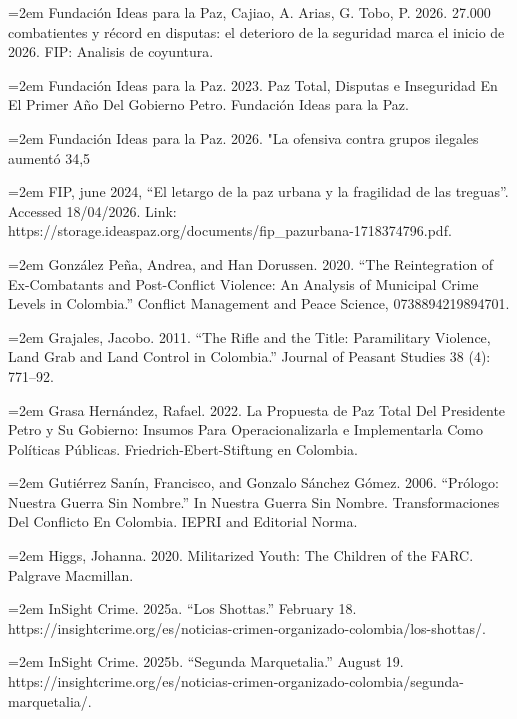 \documentclass[11pt]{article}
\begin{document}
\noindent
\hangindent=2em
Fundación Ideas para la Paz, Cajiao, A. Arias, G. Tobo, P. 2026. 27.000 combatientes y récord en disputas: el deterioro de la seguridad marca el inicio de 2026. FIP: Analisis de coyuntura.

\noindent
\hangindent=2em
Fundación Ideas para la Paz. 2023. Paz Total, Disputas e Inseguridad En El Primer Año Del Gobierno Petro. Fundación Ideas para la Paz.

\noindent
\hangindent=2em
Fundación Ideas para la Paz. 2026. "La ofensiva contra grupos ilegales aumentó 34,5%

\noindent
\hangindent=2em
FIP, june 2024, “El letargo de la paz urbana y la fragilidad de las treguas”. Accessed 18/04/2026. Link: https://storage.ideaspaz.org/documents/fip_pazurbana-1718374796.pdf.

\noindent
\hangindent=2em
González Peña, Andrea, and Han Dorussen. 2020. “The Reintegration of Ex-Combatants and Post-Conflict Violence: An Analysis of Municipal Crime Levels in Colombia.” Conflict Management and Peace Science, 0738894219894701.

\noindent
\hangindent=2em
Grajales, Jacobo. 2011. “The Rifle and the Title: Paramilitary Violence, Land Grab and Land Control in Colombia.” Journal of Peasant Studies 38 (4): 771–92.

\noindent
\hangindent=2em
Grasa Hernández, Rafael. 2022. La Propuesta de Paz Total Del Presidente Petro y Su Gobierno: Insumos Para Operacionalizarla e Implementarla Como Políticas Públicas. Friedrich-Ebert-Stiftung en Colombia.

\noindent
\hangindent=2em
Gutiérrez Sanín, Francisco, and Gonzalo Sánchez Gómez. 2006. “Prólogo: Nuestra Guerra Sin Nombre.” In Nuestra Guerra Sin Nombre. Transformaciones Del Conflicto En Colombia. IEPRI and Editorial Norma.

\noindent
\hangindent=2em
Higgs, Johanna. 2020. Militarized Youth: The Children of the FARC. Palgrave Macmillan.

\noindent
\hangindent=2em
InSight Crime. 2025a. “Los Shottas.” February 18. https://insightcrime.org/es/noticias-crimen-organizado-colombia/los-shottas/.

\noindent
\hangindent=2em
InSight Crime. 2025b. “Segunda Marquetalia.” August 19. https://insightcrime.org/es/noticias-crimen-organizado-colombia/segunda-marquetalia/.
\end{document}
